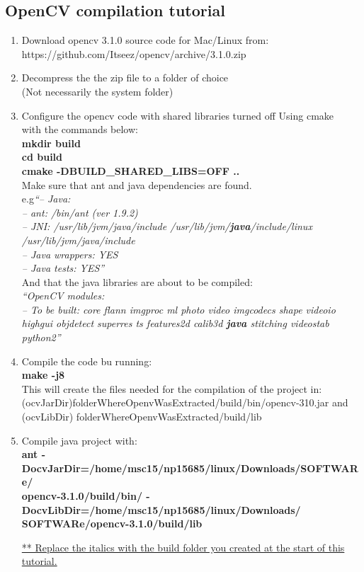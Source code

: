 \documentclass[a4paper, 11pt]{paper}
\begin{document}
\subsection{OpenCV compilation tutorial}
\begin{enumerate}
  \item Download opencv 3.1.0 source code for Mac/Linux from: \\
  https://github.com/Itseez/opencv/archive/3.1.0.zip

  \item Decompress the the zip file to a folder of choice  \\
	      (Not necessarily the system folder)

  \item Configure the opencv code with shared libraries turned off Using cmake \\
        with the commands below:\\
          \textbf{mkdir build}\\
          \textbf{cd build}\\
          \textbf{cmake -DBUILD\_SHARED\_LIBS=OFF ..}\\
        Make sure that ant and java dependencies are found.\\
        e.g\textit{``--   Java:\\
        -- 	ant:                     	/bin/ant (ver 1.9.2)\\
        -- 	JNI:                     	/usr/lib/jvm/java/include /usr/lib/jvm/\textbf{java}/include/linux /usr/lib/jvm/java/include\\
        -- 	Java wrappers:           	YES\\
        -- 	Java tests:              	YES''}\\
        And that the java libraries are about to be compiled:\\
        \textit{``OpenCV modules:\\
        -- 	To be built:             	core flann imgproc ml photo video imgcodecs shape videoio highgui objdetect superres ts features2d calib3d \textbf{java} stitching videostab python2''}
  \item Compile the code bu running:\\
        \textbf{make -j8}\\
        This will create the files needed for the compilation of the project in:\\
            (ocvJarDir)folderWhereOpenvWasExtracted/build/bin/opencv-310.jar and\\
	          (ocvLibDir) folderWhereOpenvWasExtracted/build/lib
   \item Compile java project with:\\
\textbf{ant -DocvJarDir=/home/msc15/np15685/linux/Downloads/SOFTWARe/\\opencv-3.1.0/build/bin/ -DocvLibDir=/home/msc15/np15685/linux/Downloads/\\SOFTWARe/opencv-3.1.0/build/lib}

\underline{** Replace the italics with the build folder you created at the start of this tutorial.}
\end{enumerate}
\end{document}
